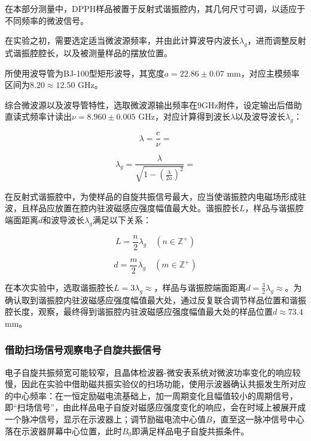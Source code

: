 \documentclass{thuemp}
\begin{document}
在本部分测量中，DPPH样品被置于反射式谐振腔内，其几何尺寸可调，以适应于不同频率的微波信号。

在实验之初，需要选定适当微波源频率，并由此计算波导内波长$\lambda_g$，进而调整反射式谐振腔腔长，以及被测量样品的摆放位置。

所使用波导管为BJ-100型矩形波导，其宽度$a=22.86\pm0.07$ \si{\milli\meter}，对应主模频率区间为$8.20 \approx 12.50$ \si{\giga\hertz}。

综合微波源以及波导管特性，选取微波源输出频率在$9$\si{\giga\hertz}附件，设定输出后借助直读式频率计读出$\nu  = 8.960 \pm 0.005$ \si{\giga\hertz}，对应计算得到波长$\lambda$以及波导波长$\lambda_g$：

\begin{equation}
\lambda = \frac{c}{\nu} = 
\end{equation}

\begin{equation}
\lambda_g = \frac{\lambda}{\sqrt{1 - \left(\frac{\lambda}{2a}\right)^2}} = 
\end{equation}

在反射式谐振腔中，为使样品的自旋共振信号最大，应当使谐振腔内电磁场形成驻波，且样品应放置在腔内驻波磁感应强度幅值最大处。谐振腔长$L$，样品与谐振腔端面距离$d$和波导波长$\lambda_g$满足以下关系：

\begin{equation}
L = \frac{n}{2}\lambda_g \quad (n \in \mathbb{Z}^+)
\end{equation}

\begin{equation}
d = \frac{m}{2}\lambda_g \quad (m \in \mathbb{Z}^+)
\end{equation}

在本次实验中，选取谐振腔长$L=3\lambda_g\approx$，样品与谐振腔端面距离$d=\frac{3}{2}\lambda_g\approx$。为确认取到谐振腔内驻波磁感应强度幅值最大处，通过反复联合调节样品位置和谐振腔长度，观察，最终得到谐振腔内驻波磁感应强度幅值最大处的样品位置$d \approx 73.4 $\si{\milli\meter}。

\subsubsection{借助扫场信号观察电子自旋共振信号}

电子自旋共振频宽可能较窄，且晶体检波器-微安表系统对微波功率变化的响应较慢，因此在实验中借助磁共振实验仪的扫场功能，使用示波器确认共振发生所对应的中心频率：在一恒定励磁电流基础上，加一周期变化且幅值较小的周期信号，即“扫场信号”，由此样品电子自旋对磁感应强度变化的响应，会在时域上被展开成一个脉冲信号，显示在示波器上；调节励磁电流中心值$B$，直至这一脉冲信号中心落在示波器屏幕中心位置，此时$B_0$即满足样品电子自旋共振条件。
\end{document}

